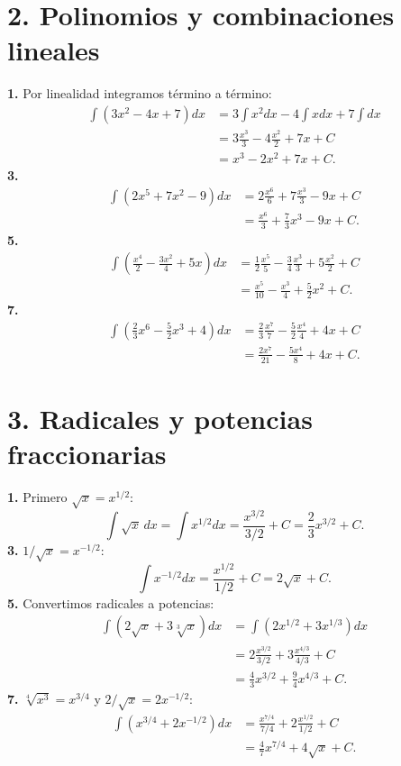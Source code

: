 \documentclass[11pt]{article}
\begin{document}
\section*{2. Polinomios y combinaciones lineales}
\textbf{1.} Por linealidad integramos término a término:
\begin{align*}\int(3x^2-4x+7)dx&=3\int x^2dx-4\int xdx+7\int dx\\&=3\frac{x^3}{3}-4\frac{x^2}{2}+7x+C\\&=x^3-2x^2+7x+C.\end{align*}
\textbf{3.}\begin{align*}\int(2x^5+7x^2-9)dx&=2\frac{x^6}{6}+7\frac{x^3}{3}-9x+C\\&=\frac{x^6}{3}+\frac73x^3-9x+C.\end{align*}
\textbf{5.}\begin{align*}\int\left(\frac{x^4}{2}-\frac{3x^2}{4}+5x\right)dx&=\frac12\frac{x^5}{5}-\frac34\frac{x^3}{3}+5\frac{x^2}{2}+C\\&=\frac{x^5}{10}-\frac{x^3}{4}+\frac52x^2+C.\end{align*}
\textbf{7.}\begin{align*}\int\left(\frac23x^6-\frac52x^3+4\right)dx&=\frac23\frac{x^7}{7}-\frac52\frac{x^4}{4}+4x+C\\&=\frac{2x^7}{21}-\frac{5x^4}{8}+4x+C.\end{align*}

\section*{3. Radicales y potencias fraccionarias}
\textbf{1.} Primero $\sqrt{x}=x^{1/2}$:
\[\int\sqrt{x}\,dx=\int x^{1/2}dx=\frac{x^{3/2}}{3/2}+C=\frac23x^{3/2}+C.\]
\textbf{3.} $1/\sqrt{x}=x^{-1/2}$:
\[\int x^{-1/2}dx=\frac{x^{1/2}}{1/2}+C=2\sqrt{x}+C.\]
\textbf{5.} Convertimos radicales a potencias:
\begin{align*}\int(2\sqrt{x}+3\sqrt[3]{x})dx&=\int(2x^{1/2}+3x^{1/3})dx\\&=2\frac{x^{3/2}}{3/2}+3\frac{x^{4/3}}{4/3}+C\\&=\frac43x^{3/2}+\frac94x^{4/3}+C.\end{align*}
\textbf{7.} $\sqrt[4]{x^3}=x^{3/4}$ y $2/\sqrt{x}=2x^{-1/2}$:
\begin{align*}\int\left(x^{3/4}+2x^{-1/2}\right)dx&=\frac{x^{7/4}}{7/4}+2\frac{x^{1/2}}{1/2}+C\\&=\frac47x^{7/4}+4\sqrt{x}+C.\end{align*}
\end{document}
